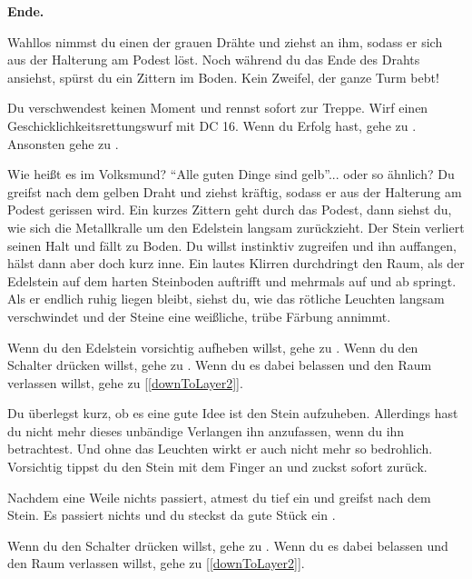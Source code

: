 \textbf{Ende.}


Wahllos nimmst du einen der grauen Drähte und ziehst an ihm, sodass er sich aus der Halterung am Podest löst. Noch während du das Ende des Drahts ansiehst, spürst du ein Zittern im Boden. Kein Zweifel, der ganze Turm bebt!

Du verschwendest keinen Moment und rennst sofort zur Treppe. Wirf einen Geschicklichkeitsrettungswurf mit DC 16. Wenn du Erfolg hast, gehe zu . Ansonsten gehe zu .


Wie heißt es im Volksmund? ``Alle guten Dinge sind gelb''... oder so ähnlich? Du greifst nach dem gelben Draht und ziehst kräftig, sodass er aus der Halterung am Podest gerissen wird. Ein kurzes Zittern geht durch das Podest, dann siehst du, wie sich die Metallkralle um den Edelstein langsam zurückzieht. Der Stein verliert seinen Halt und fällt zu Boden. Du willst instinktiv zugreifen und ihn auffangen, hälst dann aber doch kurz inne. Ein lautes Klirren durchdringt den Raum, als der Edelstein auf dem harten Steinboden auftrifft und mehrmals auf und ab springt. Als er endlich ruhig liegen bleibt, siehst du, wie das rötliche Leuchten langsam verschwindet und der Steine eine weißliche, trübe Färbung annimmt.

Wenn du den Edelstein vorsichtig aufheben willst, gehe zu .
Wenn du den Schalter drücken willst, gehe zu .
Wenn du es dabei belassen und den Raum verlassen willst, gehe zu [\ref{downToLayer2}].


Du überlegst kurz, ob es eine gute Idee ist den Stein aufzuheben. Allerdings hast du nicht mehr dieses unbändige Verlangen ihn anzufassen, wenn du ihn betrachtest. Und ohne das Leuchten wirkt er auch nicht mehr so bedrohlich. Vorsichtig tippst du den Stein mit dem Finger an und zuckst sofort zurück.

Nachdem eine Weile nichts passiert, atmest du tief ein und greifst nach dem Stein. Es passiert nichts und du steckst da gute Stück ein .

Wenn du den Schalter drücken willst, gehe zu .
Wenn du es dabei belassen und den Raum verlassen willst, gehe zu [\ref{downToLayer2}].

